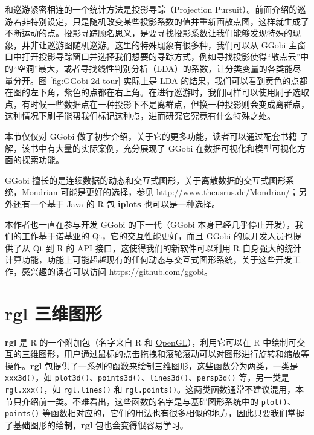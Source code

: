 \documentclass[
  b5paper,
  UTF8,twoside]{book}
\begin{document}
和巡游紧密相连的一个统计方法是投影寻踪（Projection Pursuit）。前面介绍的巡游若非特别设定，只是随机改变某些投影系数的值并重新画散点图，这样就生成了不断运动的点。投影寻踪顾名思义，是要寻找投影系数让我们能够发现特殊的现象，并非让巡游图随机巡游。这里的特殊现象有很多种，我们可以从 GGobi 主窗口中打开投影寻踪窗口并选择我们想要的寻踪方式，例如寻找投影使得``散点云''中的``空洞''最大，或者寻找线性判别分析（LDA）的系数，让分类变量的各类能尽量分开。图 \ref{fig:GGobi-2d-tour} 实际上是 LDA 的结果，我们可以看到黄色的点都在图的左下角，紫色的点都在右上角。在进行巡游时，我们同样可以使用刷子选取点，有时候一些数据点在一种投影下不是离群点，但换一种投影则会变成离群点，这种情况下刷子能帮我们标记这种点，进而研究它究竟有什么特殊之处。

本节仅仅对 GGobi 做了初步介绍，关于它的更多功能，读者可以通过配套书籍 \citet{Cook07} 了解，该书中有大量的实际案例，充分展现了 GGobi 在数据可视化和模型可视化方面的探索功能。

GGobi 擅长的是连续数据的动态和交互式图形，关于离散数据的交互式图形系统，Mondrian \citep{Theus02} 可能是更好的选择，参见 \url{http://www.theusrus.de/Mondrian/}；另外还有一个基于 Java 的 R 包 \textbf{iplots} \citep{iplots} 也可以是一种选择。

本作者也一直在参与开发 GGobi 的下一代（GGobi 本身已经几乎停止开发），我们的工作基于诺基亚的 Qt，它的交互性能更好，而且 GGobi 的原开发人员也提供了从 Qt 到 R 的 API 接口，这使得我们的新软件可以利用 R 自身强大的统计计算功能，功能上可能超越现有的任何动态与交互式图形系统，关于这些开发工作，感兴趣的读者可以访问 \url{https://github.com/ggobi}。

\hypertarget{sec:rgl}{%
\section{rgl 三维图形}\label{sec:rgl}}

\textbf{rgl} 是 R 的一个附加包（名字来自 R 和 \href{https://www.opengl.org/}{OpenGL}），利用它可以在 R 中绘制可交互的三维图形，用户通过鼠标的点击拖拽和滚轮滚动可以对图形进行旋转和缩放等操作。\textbf{rgl} 包提供了一系列的函数来绘制三维图形，这些函数分为两类，一类是 \texttt{xxx3d()}，如 \texttt{plot3d()}、\texttt{points3d()}、\texttt{lines3d()}、\texttt{persp3d()} 等，另一类是 \texttt{rgl.xxx()}，如 \texttt{rgl.lines()} 和 \texttt{rgl.points()}。这两类函数通常不建议混用，本节只介绍前一类。不难看出，这些函数的名字是与基础图形系统中的 \texttt{plot()}、\texttt{points()} 等函数相对应的，它们的用法也有很多相似的地方，因此只要我们掌握了基础图形的绘制，\textbf{rgl} 包也会变得很容易学习。
\end{document}
